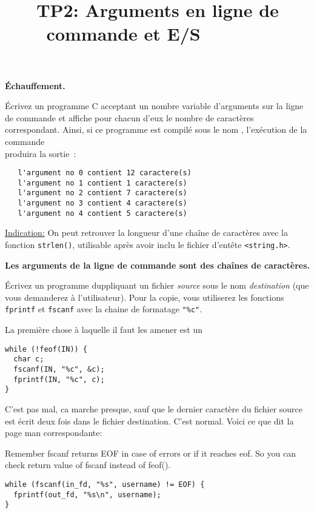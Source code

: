 \documentclass[10pt]{article}\usepackage[correction,nu]{esial}
\begin{document}
\title{TP2: Arguments en ligne de commande et E/S~~~~~~~}
\maketitle

\Exercice\textbf{Échauffement.}

\Question Écrivez un programme C acceptant un nombre variable d'arguments sur
la ligne de commande et affiche pour chacun d'eux le nombre de caractères
correspondant. Ainsi, si ce programme est compilé sous le nom
, l'exécution de la commande\\
 produira la sortie~:
\begin{verbatim}
   l'argument no 0 contient 12 caractere(s)
   l'argument no 1 contient 1 caractere(s)
   l'argument no 2 contient 7 caractere(s)
   l'argument no 3 contient 4 caractere(s)
   l'argument no 4 contient 5 caractere(s)
\end{verbatim}

\noindent\underline{Indication:} On peut retrouver la longueur d'une chaîne de
caractères avec la fonction \texttt{strlen()}, utilisable après avoir inclu le
fichier d'entête \texttt{<string.h>}.

\Exercice\textbf{Les arguments de la ligne de commande sont des chaînes
de caractères.}

\Question Écrivez un programme duppliquant un fichier \textit{source} sous le
nom \textit{destination} (que vous demanderez à l'utilisateur). Pour la copie,
vous utiliserez les fonctions \texttt{fprintf} et \texttt{fscanf} avec la
chaine de formatage \texttt{"\%c"}.

\begin{Reponse}
  La première chose à laquelle il faut les amener est un
  \begin{Verbatim}
while (!feof(IN)) {
  char c;
  fscanf(IN, "%c", &c);
  fprintf(IN, "%c", c);    
}
  \end{Verbatim}
  C'est pas mal, ca marche presque, sauf que le dernier caractère du fichier
  source est écrit deux fois dans le fichier destination. C'est normal. Voici
  ce que dit la page man correspondante:

  Remember fscanf returns EOF in case of errors or if it reaches eof. So you
  can check return value of fscanf instead of feof().
\begin{Verbatim}
while (fscanf(in_fd, "%s", username) != EOF) {
  fprintf(out_fd, "%s\n", username);
}  
\end{Verbatim}

\end{Reponse}
\end{document}
